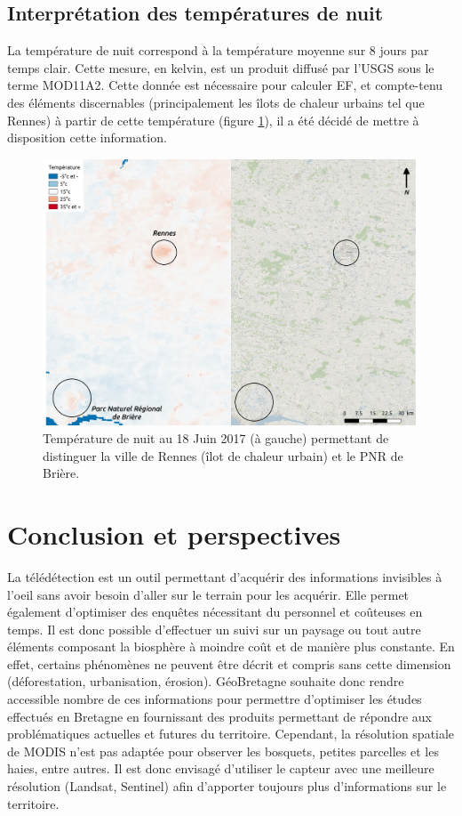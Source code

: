 \documentclass[10pt,a4paper]{article}
\begin{document}
\subsection{Interprétation des températures de nuit}

La température de nuit correspond à la température moyenne sur 8 jours par temps clair. Cette mesure, en kelvin, est un produit diffusé par l'USGS sous le terme MOD11A2. Cette donnée est nécessaire pour calculer EF, et compte-tenu des éléments discernables (principalement les îlots de chaleur urbains tel que Rennes) à partir de cette température (figure \ref{TN1}), il a été décidé de mettre à disposition cette information. \smallbreak 

\begin{figure}[!h]
\centering
\includegraphics[scale=0.33]{img/TN_interpretation1.pdf}
\caption{Température de nuit au 18 Juin 2017 (à gauche) permettant de distinguer la ville de Rennes (îlot de chaleur urbain) et le PNR de Brière.}
\label{TN1}
\end{figure}

\section{Conclusion et perspectives}

La télédétection est un outil permettant d'acquérir des informations invisibles à l’oeil sans avoir besoin d'aller sur le terrain pour les acquérir. Elle permet également d'optimiser des enquêtes nécessitant du personnel et coûteuses en temps. Il est donc possible d'effectuer un suivi sur un paysage ou tout autre éléments composant la biosphère à moindre coût et de manière plus constante. En effet, certains phénomènes ne peuvent être décrit et compris sans cette dimension (déforestation, urbanisation, érosion).\smallbreak
GéoBretagne souhaite donc rendre accessible nombre de ces informations pour permettre d'optimiser les études effectués en Bretagne en fournissant des produits permettant de répondre aux problématiques actuelles et futures du territoire.\smallbreak
Cependant, la résolution spatiale de MODIS n'est pas adaptée pour observer les bosquets, petites parcelles et les haies, entre autres. Il est donc envisagé d'utiliser le capteur avec une meilleure résolution (Landsat, Sentinel) afin d'apporter toujours plus d'informations sur le territoire.
\end{document}
